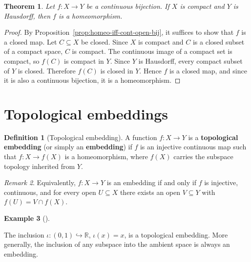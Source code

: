\documentclass[11pt,a4paper,twoside]{book}
\newtheorem{theorem}{Theorem}[section]
\theoremstyle{remark}
\newtheorem{remark}[theorem]{Remark}
\theoremstyle{definition}
\newtheorem{exampleplain}[theorem]{Example}
\theoremstyle{definition}
\newtheorem{definition}{Definition}[section]
\newenvironment{example}[1][]{%
  \begin{exampleplain}[#1]\itshape
}{%
  \end{exampleplain}
}
\begin{document}
\begin{theorem}
\label{thm:cont-bij-compact-hausdorff}
Let $f\colon X\to Y$ be a continuous bijection.  If $X$ is compact and $Y$ is
Hausdorff, then $f$ is a homeomorphism.
\end{theorem}

\begin{proof}
By Proposition~\ref{prop:homeo-iff-cont-open-bij}, it suffices to show that
$f$ is a closed map.  Let $C\subseteq X$ be closed.  Since $X$ is compact
and $C$ is a closed subset of a compact space, $C$ is compact.  The continuous
image of a compact set is compact, so $f(C)$ is compact in $Y$.  Since $Y$ is
Hausdorff, every compact subset of $Y$ is closed.  Therefore $f(C)$ is closed
in $Y$.  Hence $f$ is a closed map, and since it is also a continuous
bijection, it is a homeomorphism.
\end{proof}

\section{Topological embeddings}
\label{sec:embeddings}

\begin{definition}[Topological embedding]
\label{def:embedding}
A function $f\colon X\to Y$ is a \textbf{topological embedding} (or simply an
\textbf{embedding}) if $f$ is an injective continuous map such that
$f\colon X\to f(X)$ is a homeomorphism, where $f(X)$ carries the subspace
topology inherited from $Y$.
\end{definition}

\begin{remark}
\label{rem:embedding-equiv}
Equivalently, $f\colon X\to Y$ is an embedding if and only if $f$ is injective,
continuous, and for every open $U\subseteq X$ there exists an open
$V\subseteq Y$ with $f(U)=V\cap f(X)$.
\end{remark}

\begin{example}
\label{ex:embedding-interval}
The inclusion $\iota\colon (0,1)\hookrightarrow\mathbb{R}$, $\iota(x)=x$, is
a topological embedding.  More generally, the inclusion of any subspace into
the ambient space is always an embedding.
\end{example}

\end{document}
